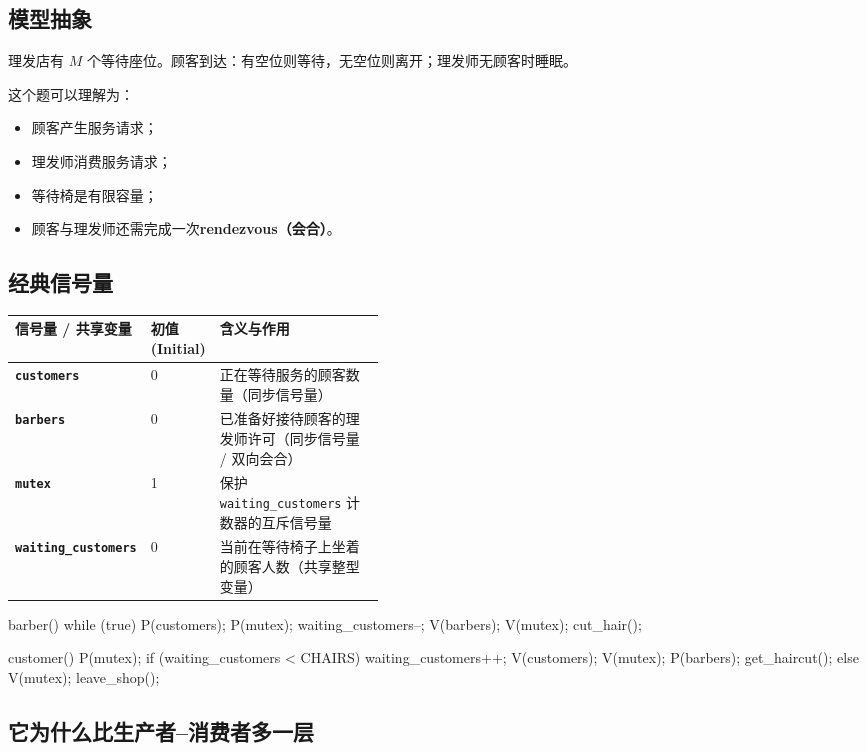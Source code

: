 \documentclass[11pt,a4paper]{ctexart}
\newcommand{\kw}[1]{\textbf{#1}}
\newcommand{\code}[1]{\texttt{#1}}
\begin{document}
\subsection{模型抽象}

理发店有 $M$ 个等待座位。顾客到达：有空位则等待，无空位则离开；理发师无顾客时睡眠。

这个题可以理解为：
\begin{itemize}
\item 顾客产生服务请求；
\item 理发师消费服务请求；
\item 等待椅是有限容量；
\item 顾客与理发师还需完成一次\kw{rendezvous（会合）}。
\end{itemize}

\subsection{经典信号量}

\begingroup
\small
\renewcommand{\arraystretch}{1.25}
\setlength{\tabcolsep}{6pt}
\begin{tabularx}{\linewidth}{>{\bfseries}p{0.28\linewidth} p{0.15\linewidth} X}
\toprule
信号量 / 共享变量 & 初值 (Initial) & 含义与作用\\
\midrule
\code{customers} & 0 & 正在等待服务的顾客数量（同步信号量）\\
\code{barbers} & 0 & 已准备好接待顾客的理发师许可（同步信号量 / 双向会合）\\
\code{mutex} & 1 & 保护 \code{waiting\_customers} 计数器的互斥信号量\\
\code{waiting\_customers} & 0 & 当前在等待椅子上坐着的顾客人数（共享整型变量）\\
\bottomrule
\end{tabularx}
\endgroup

\begin{codeblock}
barber() {
    while (true) {
        P(customers);
        P(mutex);
        waiting_customers--;
        V(barbers);
        V(mutex);
        cut_hair();
    }
}

customer() {
    P(mutex);
    if (waiting_customers < CHAIRS) {
        waiting_customers++;
        V(customers);
        V(mutex);
        P(barbers);
        get_haircut();
    } else {
        V(mutex);
        leave_shop();
    }
}
\end{codeblock}

\subsection{它为什么比生产者--消费者多一层}
\end{document}
